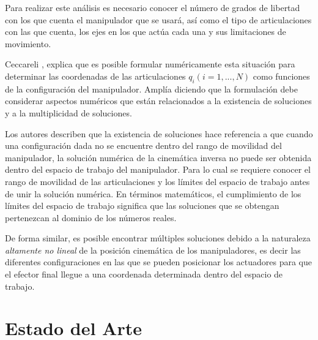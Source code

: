 Para realizar este análisis es necesario conocer el número de grados de libertad con los que cuenta el manipulador que se usará, así como el tipo de articulaciones con las que cuenta, los ejes en los que actúa cada una y sus limitaciones de movimiento.

Ceccareli \cite{ceccarelli_fundamentals_2022}, explica que es posible formular numéricamente esta situación para determinar las coordenadas de las articulaciones $q_{i}(i=1,...,N)$ como funciones de la configuración del manipulador. Amplía diciendo que la formulación debe considerar aspectos numéricos que están relacionados a la existencia de soluciones  y a la multiplicidad de soluciones.

Los autores describen que la existencia de soluciones hace referencia a que cuando una configuración dada no se encuentre dentro del rango de movilidad del manipulador, la solución numérica de la cinemática inversa no puede ser obtenida dentro del espacio de trabajo del manipulador. Para lo cual se requiere conocer el rango de movilidad de las articulaciones y los límites del espacio de trabajo antes de unir la solución numérica. En términos matemáticos, el cumplimiento de los límites del espacio de trabajo significa que las soluciones que se obtengan pertenezcan al dominio de los números reales.

De forma similar, es posible encontrar múltiples soluciones  debido a la naturaleza \textit{altamente no lineal} de la posición cinemática de los manipuladores, es decir las diferentes configuraciones en las que se pueden posicionar los actuadores para que el efector final llegue a una coordenada determinada dentro del espacio de trabajo. 




\section{Estado del Arte}

